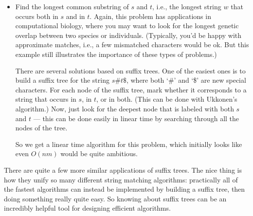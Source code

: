 \begin{itemize}
\item Find the longest common substring of $s$ and $t$, i.e., the
  longest string $w$ that occurs both in $s$ and in $t$. Again, this
  problem has applications in computational biology, where you may
  want to look for the longest genetic overlap between two species or
  individuals. (Typically, you'd be happy with approximate matches,
  i.e., a few mismatched characters would be ok. But this example
  still illustrates the importance of these types of problems.)

  There are several solutions based on suffix trees. One of the
  easiest ones is to build a suffix tree for the string $s\#t\$$,
  where both `\#' and `\$' are new special characters.
  For each node of the suffix tree, mark whether it corresponds to a
  string that occurs in $s$, in $t$, or in both. (This can be done
  with Ukkonen's algorithm.) Now, just look for the deepest node that
  is labeled with both $s$ and $t$ --- this can be done easily in
  linear time by searching through all the nodes of the tree.

  So we get a linear time algorithm for this problem, which initially
  looks like even $O(nm)$ would be quite ambitious.
\end{itemize}

There are quite a few more similar applications of suffix trees. 
The nice thing is how they unify so many different string matching
algorithms: practically all of the fastest algorithms can instead be
implemented by building a suffix tree, then doing something really
quite easy. So knowing about suffix trees can be an incredibly helpful
tool for designing efficient algorithms.